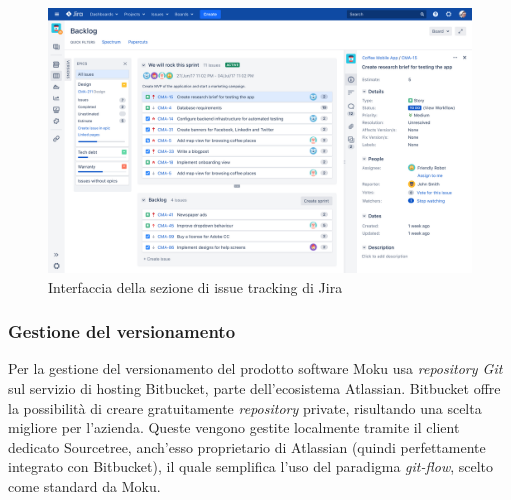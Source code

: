 \begin{figure}[h!]
    \includegraphics[width=\textwidth]{figures/Jira.png}
    \caption[Interfaccia della sezione di issue tracking di Jira]{Interfaccia della sezione di issue tracking di Jira
    \label{fig:Jira}}
\end{figure}    

\subsubsection{Gestione del versionamento}
Per la gestione del versionamento del prodotto software Moku usa \textit{repository Git} sul servizio di hosting Bitbucket, parte dell'ecosistema Atlassian. Bitbucket offre la possibilità di creare gratuitamente \textit{repository} private, risultando una scelta migliore per l'azienda. Queste vengono gestite localmente tramite il client dedicato Sourcetree, anch'esso proprietario di Atlassian (quindi perfettamente integrato con Bitbucket), il quale semplifica l'uso del paradigma \textit{git-flow}, scelto come standard da Moku.

